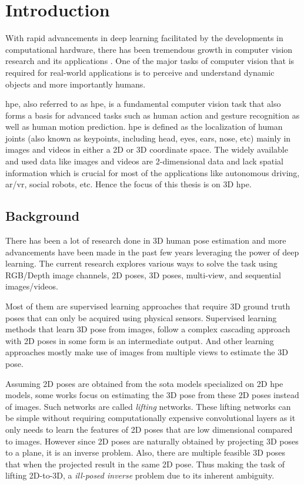 \chapter{Introduction}
\label{chap:introduction}
With rapid advancements in deep learning facilitated by the developments in computational hardware, there has been tremendous growth in computer vision research and its applications \cite{AIandCompute}. One of the major tasks of computer vision that is required for real-world applications is to perceive and understand dynamic objects and more importantly humans.

\acl{hpe}, also referred to as \ac{hpe}, is a fundamental computer vision task that also forms a basis for advanced tasks such as human action and gesture recognition as well as human motion prediction. \ac{hpe} is defined as the localization of human joints (also known as keypoints, including head, eyes, ears, nose, etc) mainly in images and videos in either a 2D or 3D coordinate space. The widely available and used data like images and videos are 2-dimensional data and lack spatial information which is crucial for most of the applications like autonomous driving, \ac{ar/vr}, social robots, etc. Hence the focus of this thesis is on 3D \ac{hpe}.

\section{Background}
\label{sec:background}

There has been a lot of research done in 3D human pose estimation and more advancements have been made in the past few years leveraging the power of deep learning. The current research explores various ways to solve the task using RGB/Depth image channels, 2D poses, 3D poses, multi-view, and sequential images/videos. 

Most of them are supervised learning approaches that require 3D ground truth poses that can only be acquired using physical sensors. Supervised learning methods that learn 3D pose from images, follow a complex cascading approach with 2D poses in some form is an intermediate output. And other learning approaches mostly make use of images from multiple views to estimate the 3D pose. 

Assuming 2D poses are obtained from the \ac{sota} models specialized on 2D \ac{hpe} models, some works focus on estimating the 3D pose from these 2D poses instead of images. Such networks are called \textit{lifting} networks. These lifting networks can be simple without requiring computationally expensive convolutional layers as it only needs to learn the features of 2D poses that are low dimensional compared to images. However since 2D poses are naturally obtained by projecting 3D poses to a plane, it is an inverse problem. Also, there are multiple feasible 3D poses that when the projected result in the same 2D pose. Thus making the task of lifting 2D-to-3D, a \textit{ill-posed inverse} problem due to its inherent ambiguity.

